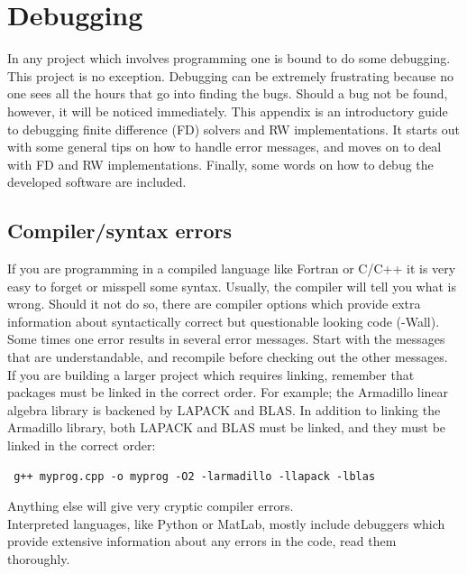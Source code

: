 \section{Debugging}\label{debugging}

In any project which involves programming one is bound to do some debugging. This project is no exception. 
Debugging can be extremely frustrating because no one sees all the hours that go into finding the bugs. 
Should a bug not be found, however, it will be noticed immediately. 
This appendix is an introductory guide to debugging finite difference (FD) solvers and RW implementations. It starts out with some general tips on how to handle error messages, and moves on to deal with FD and RW implementations. 
Finally, some words on how to debug the developed software are included.

\subsection{Compiler/syntax errors}
If you are programming in a compiled language like Fortran or C/C++ it is very easy to forget or misspell some syntax. 
Usually, the compiler will tell you what is wrong. 
Should it not do so, there are compiler options which provide extra information about syntactically correct but questionable looking code (-Wall). 
Some times one error results in several error messages. 
Start with the messages that are understandable, and recompile before checking out the other messages. \\

\noindent If you are building a larger project which requires linking, remember that packages must be linked in the correct order. 
For example; the Armadillo linear algebra library is backened by LAPACK and BLAS. 
In addition to linking the Armadillo library, both LAPACK and BLAS must be linked, and they must be linked in the correct order: 
\begin{lstlisting}
 g++ myprog.cpp -o myprog -O2 -larmadillo -llapack -lblas
\end{lstlisting}
Anything else will give very cryptic compiler errors. \\

Interpreted languages, like Python or MatLab, mostly include debuggers which provide extensive information about any errors in the code, read them thoroughly.

